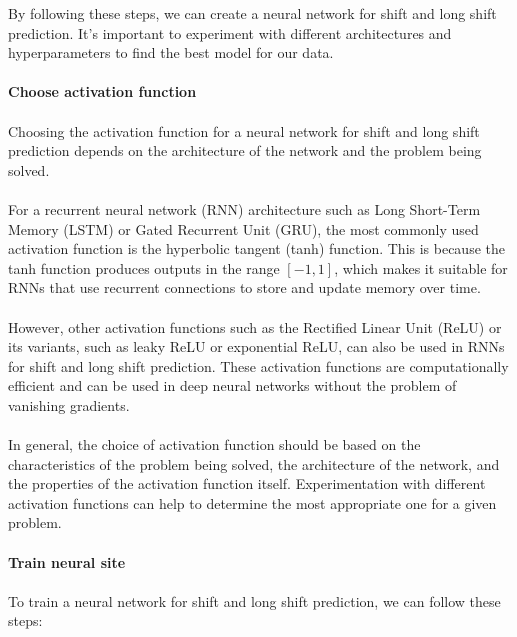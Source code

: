         By following these steps, we can create a neural network for shift and long shift prediction.
        It's important to experiment with different architectures and hyperparameters to find the best
        model for our data.\\
        \\
        \textbf{Choose activation function}\\
        \\
        Choosing the activation function for a neural network for shift and long shift prediction depends on the
        architecture of the network and the problem being solved.\\
        \\
        For a recurrent neural network (RNN) architecture such as Long Short-Term Memory (LSTM) or
        Gated Recurrent Unit (GRU), the most commonly used activation function is the hyperbolic tangent (tanh) function.
        This is because the tanh function produces outputs in the range $[-1, 1]$, which makes it suitable for RNNs
        that use recurrent connections to store and update memory over time.\\
        \\
        However, other activation functions such as the Rectified Linear Unit (ReLU) or its variants, such as leaky
        ReLU or exponential ReLU, can also be used in RNNs for shift and long shift prediction. These activation
        functions are computationally efficient and can be used in deep neural networks without the problem of
        vanishing gradients.\\
        \\
        In general, the choice of activation function should be based on the characteristics of the problem being
        solved, the architecture of the network, and the properties of the activation function itself.
        Experimentation with different activation functions can help to determine the most appropriate one
        for a given problem.\\
        \\
        \textbf{Train neural site}\\
        \\
        To train a neural network for shift and long shift prediction, we can follow these steps:
